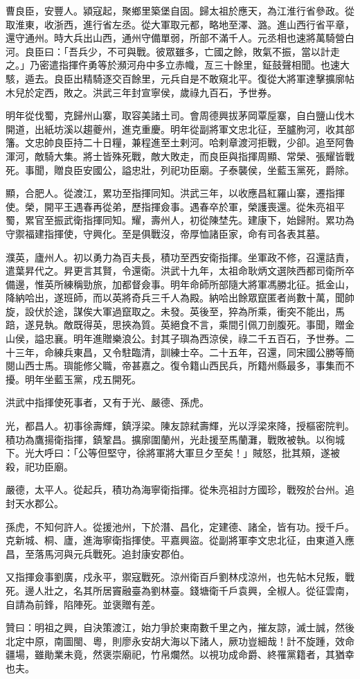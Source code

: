\begin{pinyinscope}
曹良臣，安豐人。潁寇起，聚鄉里築堡自固。歸太祖於應天，為江淮行省參政。從取淮東，收浙西，進行省左丞。從大軍取元都，略地至澤、潞。進山西行省平章，還守通州。時大兵出山西，通州守備單弱，所部不滿千人。元丞相也速將萬騎營白河。良臣曰：「吾兵少，不可與戰。彼眾雖多，亡國之餘，敗氣不振，當以計走之。」乃密遣指揮仵勇等於瀕河舟中多立赤幟，亙三十餘里，鉦鼓聲相聞。也速大駭，遁去。良臣出精騎逐交百餘里，元兵自是不敢窺北平。復從大將軍達擊擴廓帖木兒於定西，敗之。洪武三年封宣寧侯，歲祿九百石，予世券。

明年從伐蜀，克歸州山寨，取容美諸土司。會周德興拔茅岡覃垕寨，自白鹽山伐木開道，出紙坊溪以趨夔州，進克重慶。明年從副將軍文忠北征，至臚朐河，收其部籓。文忠帥良臣持二十日糧，兼程進至土剌河。哈剌章渡河拒戰，少卻。追至阿魯渾河，敵騎大集。將士皆殊死戰，敵大敗走，而良臣與指揮周顯、常榮、張耀皆戰死。事聞，贈良臣安國公，謚忠壯，列祀功臣廟。子泰襲侯，坐藍玉黨死，爵除。

顯，合肥人。從渡江，累功至指揮同知。洪武三年，以收應昌紅羅山寨，遷指揮使。榮，開平王遇春再從弟，歷指揮僉事。遇春卒於軍，榮護喪還。從朱亮祖平蜀，累官至振武衛指揮同知。耀，壽州人，初從陳埜先。建康下，始歸附。累功為守禦福建指揮使，守興化。至是俱戰沒，帝厚恤諸臣家，命有司各表其墓。

濮英，廬州人。初以勇力為百夫長，積功至西安衛指揮。坐軍政不修，召還詰責，遣葉昇代之。昇更言其賢，令還衛。洪武十九年，太祖命耿炳文選陜西都司衛所卒備邊，惟英所練稱勁旅，加都督僉事。明年命師所部隨大將軍馮勝北征。抵金山，降納哈出，遂班師，而以英將奇兵三千人為殿。納哈出餘眾竄匿者尚數十萬，聞帥旋，設伏於途，謀俟大軍過竄取之。未發。英後至，猝為所乘，衝突不能出，馬踣，遂見執。敵既得英，思挾為質。英絕食不言，乘間引佩刀剖腹死。事聞，贈金山侯，謚忠襄。明年進贈樂浪公。封其子璵為西涼侯，祿二千五百石，予世券。二十三年，命練兵東昌，又令駐臨清，訓練士卒。二十五年，召還，同宋國公勝等簡閱山西士馬。璵能修父職，帝甚嘉之。復令籍山西民兵，所籍州縣最多，事集而不擾。明年坐藍玉黨，戍五開死。

洪武中指揮使死事者，又有于光、嚴德、孫虎。

光，都昌人。初事徐壽輝，鎮浮梁。陳友諒弒壽輝，光以浮梁來降，授樞密院判。積功為鷹揚衛指揮，鎮鞏昌。擴廓圍蘭州，光赴援至馬蘭灘，戰敗被執。以徇城下。光大呼曰：「公等但堅守，徐將軍將大軍旦夕至矣！」賊怒，批其頰，遂被殺，祀功臣廟。

嚴德，太平人。從起兵，積功為海寧衛指揮。從朱亮祖討方國珍，戰歿於台州。追封天水郡公。

孫虎，不知何許人。從援池州，下於潛、昌化，定建德、諸全，皆有功。授千戶。克新城、桐、廬，進海寧衛指揮使。平嘉興盜。從副將軍李文忠北征，由東道入應昌，至落馬河與元兵戰死。追封康安郡伯。

又指揮僉事劉廣，戍永平，禦寇戰死。涼州衛百戶劉林戍涼州，也先帖木兒叛，戰死。邊人壯之，名其所居竇融臺為劉林臺。錢塘衛千戶袁興，全椒人。從征雲南，自請為前鋒，陷陣死。並褒贈有差。

贊曰：明祖之興，自決策渡江，始力爭於東南數千里之內，摧友諒，滅士誠，然後北定中原，南圖閩、粵，則廖永安胡大海以下諸人，厥功豈細哉！計不旋踵，效命疆場，雖勛業未竟，然褒崇廟祀，竹帛爛然。以視功成命爵、終罹黨籍者，其猶幸也夫。


\end{pinyinscope}